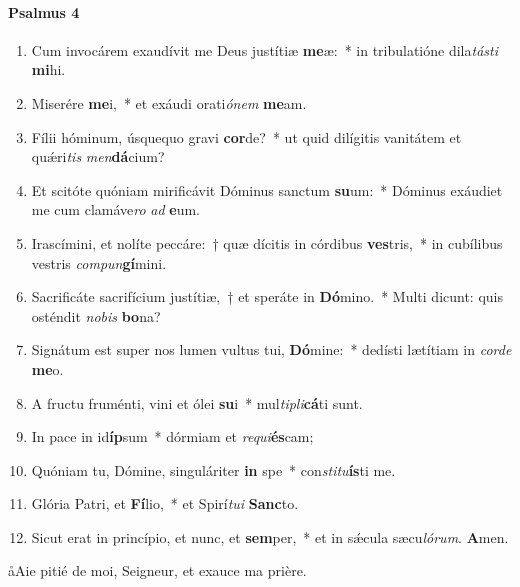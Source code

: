 \documentclass[twoside]{article}
\begin{document}
\begin{paracol}[1]{2}
\paragraph{Psalmus 4}
\begin{enumerate}[wide, itemsep=0mm, labelwidth=!, labelindent=0pt, label=\color{gregoriocolor}\theenumi]
\item Cum invocárem exaudívit me Deus justítiæ \textbf{me}æ:~* in tribulatióne dila\textit{tás}\textit{ti} \textbf{mi}hi.
\item Miserére \textbf{me}i,~* et exáudi orati\textit{ó}\textit{nem} \textbf{me}am.
\item Fílii hóminum, úsquequo gravi \textbf{cor}de?~* ut quid dilígitis vanitátem et quǽri\textit{tis} \textit{men}\textbf{dá}cium?
\item Et scitóte quóniam mirificávit Dóminus sanctum \textbf{su}um:~* Dóminus exáudiet me cum clamáve\textit{ro} \textit{ad} \textbf{e}um.
\item Irascímini, et nolíte peccáre:~† quæ dícitis in córdibus \textbf{ves}tris,~* in cubílibus vestris \textit{com}\textit{pun}\textbf{gí}mini.
\item Sacrificáte sacrifícium justítiæ,~† et speráte in \textbf{Dó}mino.~* Multi dicunt: quis osténdit \textit{no}\textit{bis} \textbf{bo}na?
\item Signátum est super nos lumen vultus tui, \textbf{Dó}mine:~* dedísti lætítiam in \textit{cor}\textit{de} \textbf{me}o.
\item A fructu fruménti, vini et ólei \textbf{su}i~* mul\textit{ti}\textit{pli}\textbf{cá}ti sunt.
\item In pace in id\textbf{íp}sum~* dórmiam et \textit{re}\textit{qui}\textbf{és}cam;
\item Quóniam tu, Dómine, singuláriter \textbf{in} spe~* con\textit{sti}\textit{tu}\textbf{ís}ti me.
\item Glória Patri, et \textbf{Fí}lio,~* et Spirí\textit{tu}\textit{i} \textbf{Sanc}to.
\item Sicut erat in princípio, et nunc, et \textbf{sem}per,~* et in sǽcula sæcu\textit{ló}\textit{rum}. \textbf{A}men.\capsaut{}
\end{enumerate}

\switchcolumn

\aa Aie pitié de moi, Seigneur, et exauce ma prière.


\end{paracol}
\end{document}
